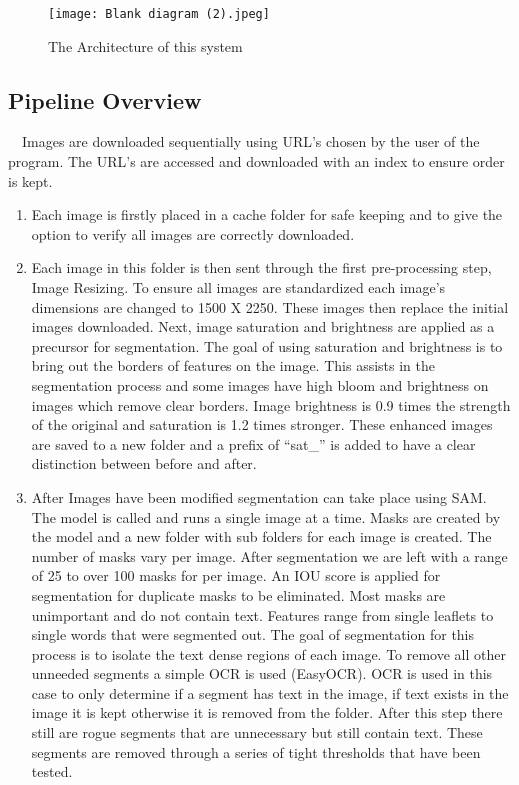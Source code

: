 \documentclass{article}
\begin{document}
\begin{figure}[h!]
  \centering
  \texttt{[image: Blank diagram (2).jpeg]}
  \caption{The Architecture of this system}
  \label{fig:enter-label}
\end{figure}



\subsection{Pipeline Overview}
$\quad$Images are downloaded sequentially using URL's chosen by the user of the program. The URL's are accessed and downloaded with an index to ensure order is kept. 
\begin{enumerate}
\item Each image is firstly placed in a cache folder for safe keeping and to give the option to verify all images are correctly downloaded. 
\item Each image in this folder is then sent through the first pre-processing step, Image Resizing. To ensure all images are standardized each image's dimensions are changed to 1500 X 2250. These images then replace the initial images downloaded. Next, image saturation and brightness are applied as a precursor for segmentation. The goal of using saturation and brightness is to bring out the borders of features on the image. This assists in the segmentation process and some images have high bloom and brightness on images which remove clear borders. Image brightness is 0.9 times the strength of the original and saturation is 1.2 times stronger. These enhanced images are saved to a new folder and a prefix of ``sat\_'' is added to have a clear distinction between before and after. 
\item After Images have been modified segmentation can take place using SAM. The model is called and runs a single image at a time. Masks are created by the model and a new folder with sub folders for each image is created. The number of masks vary per image. After segmentation we are left with a range of 25 to over 100 masks for per image. An IOU score is applied for segmentation for duplicate masks to be eliminated.  Most masks are unimportant and do not contain text. Features range from single leaflets to single words that were segmented out. The goal of segmentation for this process is to isolate the text dense regions of each image. To remove all other unneeded segments a simple OCR is used (EasyOCR). OCR is used in this case to only determine if a segment has text in the image, if text exists in the image it is kept otherwise it is removed from the folder. After this step there still are rogue segments that are unnecessary but still contain text. These segments are removed through a series of tight thresholds that have been tested. 

\end{enumerate}
\end{document}
